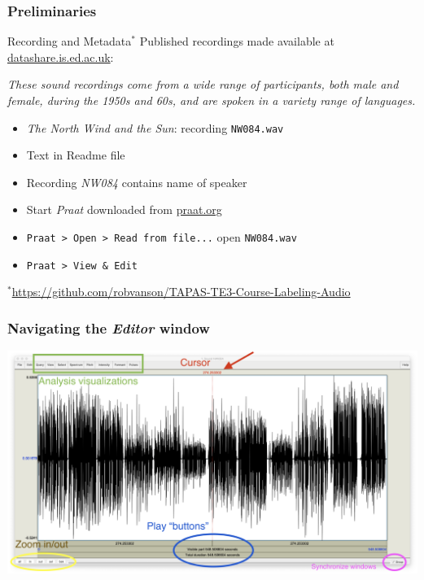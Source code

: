 \documentclass{beamer}
\begin{document}
\begin{frame} 
\frametitle{Preliminaries} 

\begin{block}{Recording and Metadata$^*$}
Published recordings made available at \href{https://datashare.is.ed.ac.uk/handle/10283/387}{datashare.is.ed.ac.uk}:

\textit{These sound recordings come from a wide range of participants, both male and female, during the 1950s and 60s, and are spoken in a variety range of languages.}
\end{block} 
\begin{itemize} 
\item \textit{The North Wind and the Sun}: recording \texttt{NW084.wav}
\item Text in Readme file
\item Recording \textit{NW084} contains name of speaker
\item Start \textit{Praat} downloaded from \href{http://www.praat.org}{praat.org}
\item \texttt{Praat > Open > Read from file...} open \texttt{NW084.wav}
\item \texttt{Praat > View \& Edit}
\end{itemize}

\vskip 0.5cm
\scriptsize{$^*$\url{https://github.com/robvanson/TAPAS-TE3-Course-Labeling-Audio}}
\end{frame}

\begin{frame} 
\frametitle{Navigating the \textit{Editor} window} 

\includegraphics[width=1\framewidth]{img/Editor_Screenshot}

\end{frame}
\end{document}
